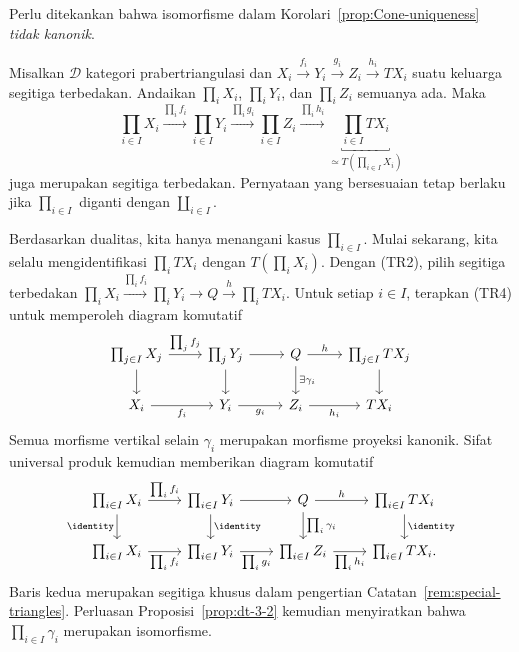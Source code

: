 Perlu ditekankan bahwa isomorfisme dalam
Korolari~\ref{prop:Cone-uniqueness} \emph{tidak kanonik}.

\begin{lema}\label{prop:dt-sum}
	Misalkan $\mathcal{D}$ kategori prabertriangulasi dan
	$X_i \xrightarrow{f_i} Y_i \xrightarrow{g_i} Z_i \xrightarrow{h_i} TX_i$
	suatu keluarga segitiga terbedakan. Andaikan $\prod_i X_i$,
	$\prod_i Y_i$, dan $\prod_i Z_i$ semuanya ada. Maka
	\[ \prod_{i \in I} X_i \xrightarrow{\prod_i f_i } \prod_{i \in I} Y_i \xrightarrow{\prod_i g_i} \prod_{i \in I} Z_i \xrightarrow{\prod_i h_i} \underbracket{\prod_{i \in I} TX_i}_{\simeq T(\prod_{i \in I} X_i)} \]
	juga merupakan segitiga terbedakan. Pernyataan yang bersesuaian tetap
	berlaku jika $\prod_{i \in I}$ diganti dengan $\coprod_{i \in I}$.
\end{lema}

\begin{bukti}
	Berdasarkan dualitas, kita hanya menangani kasus $\prod_{i \in I}$. Mulai
	sekarang, kita selalu mengidentifikasi $\prod_i TX_i$ dengan
	$T(\prod_i X_i)$. Dengan (TR2), pilih segitiga terbedakan
	$\prod_i X_i \xrightarrow{\prod_i f_i} \prod_i Y_i \to Q
	\xrightarrow{h} \prod_i TX_i$. Untuk setiap $i \in I$, terapkan (TR4)
	untuk memperoleh diagram komutatif
	\[\begin{tikzcd}
		\prod_{j \in I} X_j \arrow[r, "{\prod_j f_j}"] \arrow[d] & \prod_j Y_j \arrow[r] \arrow[d] & Q \arrow[r, "h"] \arrow[d, "{\exists \gamma_i}"] & \prod_{j \in I} TX_j \arrow[d] \\
		X_i \arrow[r, "{f_i}"'] & Y_i \arrow[r, "{g_i}"'] & Z_i \arrow[r, "{h_i}"'] & TX_i
	\end{tikzcd}\]
	Semua morfisme vertikal selain $\gamma_i$ merupakan morfisme proyeksi
	kanonik. Sifat universal produk kemudian memberikan diagram komutatif
	\[\begin{tikzcd}
		\prod_{i \in I} X_i \arrow[r, "{\prod_i f_i}"] \arrow[d, "\identity"'] & \prod_{i \in I} Y_i \arrow[r] \arrow[d, "\identity"] & Q \arrow[r, "h"] \arrow[d, "{\prod_i \gamma_i}"] & \prod_{i \in I} TX_i \arrow[d, "\identity"] \\
		\prod_{i \in I} X_i \arrow[r, "{\prod_i f_i}"'] & \prod_{i \in I} Y_i \arrow[r, "{\prod_i g_i}"'] & \prod_{i \in I} Z_i \arrow[r, "{\prod_i h_i}"'] & \prod_{i \in I} TX_i .
	\end{tikzcd}\]
	Baris kedua merupakan segitiga khusus dalam pengertian
	Catatan~\ref{rem:special-triangles}. Perluasan
	Proposisi~\ref{prop:dt-3-2} kemudian menyiratkan bahwa
	$\prod_{i \in I} \gamma_i$ merupakan isomorfisme.
\end{bukti}

